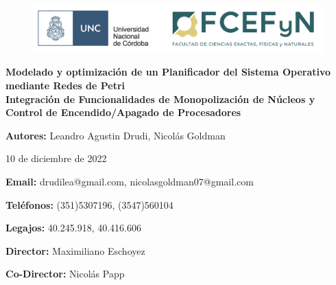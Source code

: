 \begin{titlepage}
    \begin{center}
        \vspace*{1cm}

        \begin{figure}
            \centering
            \begin{minipage}[t]{\textwidth}\centering
                \includegraphics[width=1\textwidth]{./images/color_UNC-FCEFyN.png}
            \end{minipage}\hfill
        \end{figure}

        \huge
        \textbf{Modelado y optimización de un Planificador del Sistema Operativo mediante Redes de Petri} \\

        \vspace{.5cm}
        \large
        \textbf{Integración de Funcionalidades de Monopolización de Núcleos y Control de Encendido/Apagado de Procesadores} \\

        \vspace{2cm}

        \Large
        \textbf{Autores:} Leandro Agustin Drudi, Nicolás Goldman

        \vspace{.5cm}

        \large
        10 de diciembre de 2022

        \vspace{1.5cm}

        \normalsize
        \textbf{Email:} drudilea@gmail.com, nicolasgoldman07@gmail.com

        \vspace{.5cm}

        \textbf{Teléfonos:} (351)5307196, (3547)560104

        \vspace{.5cm}

        \textbf{Legajos:} 40.245.918, 40.416.606

        \vspace{1.5cm}

        \textbf{Director:} Maximiliano Eschoyez

        \vspace{.5cm}

        \textbf{Co-Director:} Nicolás Papp

        \vspace{1cm}


        \vspace{0.5cm}

        \vfill

    \end{center}
\end{titlepage}